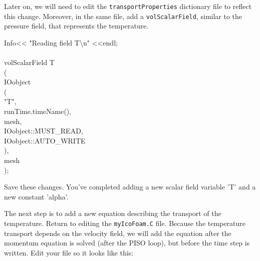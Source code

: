 \documentclass{article}
\newcommand\tab[1][0.5cm]{\hspace*{#1}}
\begin{document}
\begin{enumerate}
\begin{myframe}
{	}
	\end{myframe}

	Later on, we will need to edit the {\tt transportProperties} dictionary file to reflect this change. Moreover, in the same file, add a {\tt volScalarField}, similar to the pressure field, that represents the temperature.
	
	\begin{myframe}
	{\tt %
		
		Info<< "Reading field T\textbackslash n" <<endl; \\
		\\
		volScalarField T\\
		(\\
		\tab IOobject \\
		\tab ( \\
		\tab \tab "T",\\
		\tab \tab runTime.timeName(),\\
		\tab \tab mesh,\\
		\tab \tab IOobject::MUST\_READ,\\
		\tab \tab IOobject::AUTO\_WRITE\\
		\tab ),\\
		\tab mesh \\
		);\\
			
	}
	\end{myframe}
	
	Save these changes. You've completed adding a new scalar field variable 'T' and a new constant 'alpha'.
	
	The next step is to add a new equation describing the transport of the temperature. Return to editing the {\tt myIcoFoam.C} file. Because the temperature transport depends on the velocity field, we will add the equation after the momentum equation is solved (after the PISO loop), but before the time step is written. Edit your file so it looks like this: 
	

	\begin{myframe}
	{\tt %
		
}
\end{myframe}
\end{enumerate}
\end{document}
